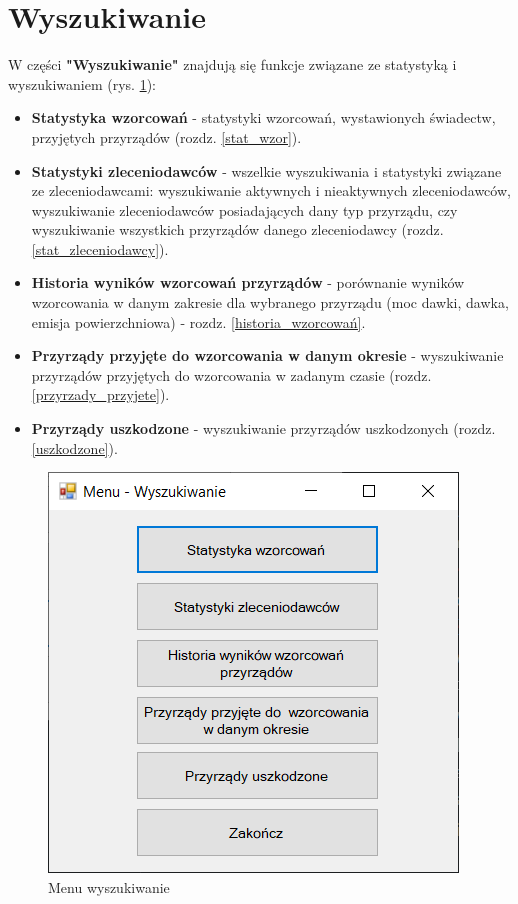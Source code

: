 
\rozdzial

\section{Wyszukiwanie}
\label{wyszukiwanie}

W części \textbf{"Wyszukiwanie"} znajdują się funkcje związane ze statystyką i wyszukiwaniem (rys. \ref{menuWyszukiwanie}):
\begin{itemize}
	\item \textbf{Statystyka wzorcowań} - statystyki wzorcowań, wystawionych świadectw, przyjętych przyrządów (rozdz. \ref{stat_wzor}).
	\item  \textbf{Statystyki zleceniodawców} - wszelkie wyszukiwania i statystyki związane ze zleceniodawcami: wyszukiwanie aktywnych i nieaktywnych zleceniodawców, wyszukiwanie zleceniodawców posiadających dany typ przyrządu, czy wyszukiwanie wszystkich przyrządów danego zleceniodawcy (rozdz. \ref{stat_zleceniodawcy}).
	\item \textbf{Historia wyników wzorcowań przyrządów} - porównanie wyników wzorcowania w danym zakresie dla wybranego przyrządu (moc dawki, dawka, emisja powierzchniowa) - rozdz. \ref{historia_wzorcowań}.
	\item \textbf{Przyrządy przyjęte do wzorcowania w danym okresie} - wyszukiwanie przyrządów przyjętych do wzorcowania w zadanym czasie (rozdz. \ref{przyrzady_przyjete}).
	\item \textbf{Przyrządy uszkodzone} - wyszukiwanie przyrządów uszkodzonych (rozdz. \ref{uszkodzone}).
\end{itemize}



\begin{figure}[htb]
	\centering
	\includegraphics{obrazki/Wyszukiwanie/menu_wyszukiwanie.png}
	\caption{Menu wyszukiwanie}
	\label{menuWyszukiwanie}
\end{figure}

